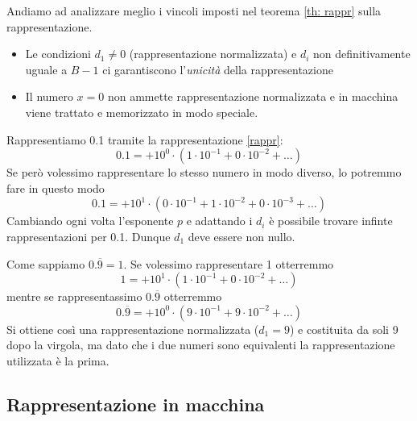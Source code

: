 Andiamo ad analizzare meglio i vincoli imposti nel teorema \ref{th: rappr} sulla rappresentazione.
\begin{itemize}
	\item Le condizioni $d_1 \neq 0$ (rappresentazione normalizzata) e $d_i$ non definitivamente uguale a
	      $B - 1$ ci garantiscono l'\emph{unicità} della rappresentazione
	\item Il numero $x = 0$ non ammette rappresentazione normalizzata e in macchina viene trattato e
	      memorizzato in modo speciale.
\end{itemize}

\begin{example}
	Rappresentiamo 0.1 tramite la rappresentazione \ref{rappr}:
	\[ 0.1 = + 10^0 \cdot (1 \cdot 10^{-1} + 0 \cdot 10^{-2} + \dots) \]
	Se però volessimo rappresentare lo stesso numero in modo diverso, lo potremmo fare in questo modo
	\[ 0.1 = + 10^1 \cdot (0 \cdot 10^{-1} + 1 \cdot 10^{-2} + 0 \cdot 10^{-3} + \dots) \]
	Cambiando ogni volta l'esponente $p$ e adattando i $d_i$ è possibile trovare infinte rappresentazioni
	per 0.1. Dunque $d_1$ deve essere non nullo.
\end{example}

\begin{example}
	Come sappiamo $0.\overline{9} = 1$. Se volessimo rappresentare 1 otterremmo
	\[ 1 = + 10^1 \cdot (1 \cdot 10^{-1} + 0 \cdot 10^{-2} + \dots) \]
	mentre se rappresentassimo $0.\overline{9}$ otterremmo
	\[ 0.\overline{9} = + 10^0 \cdot (9 \cdot 10^{-1} + 9 \cdot 10^{-2} + \dots) \]
	Si ottiene così una rappresentazione normalizzata ($d_1 = 9$) e costituita da soli 9 dopo la virgola, ma
	dato che i due numeri sono equivalenti la rappresentazione utilizzata è la prima.
\end{example}

\subsection{Rappresentazione in macchina}